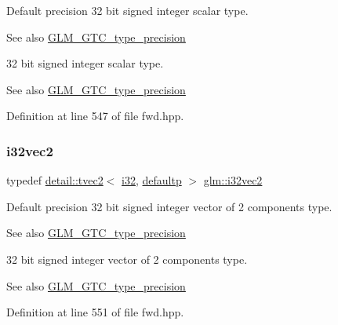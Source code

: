 Default precision 32 bit signed integer scalar type. \begin{DoxySeeAlso}{See also}
\hyperlink{group__gtc__type__precision}{G\+L\+M\+\_\+\+G\+T\+C\+\_\+type\+\_\+precision}
\end{DoxySeeAlso}
32 bit signed integer scalar type. \begin{DoxySeeAlso}{See also}
\hyperlink{group__gtc__type__precision}{G\+L\+M\+\_\+\+G\+T\+C\+\_\+type\+\_\+precision} 
\end{DoxySeeAlso}


Definition at line 547 of file fwd.\+hpp.

\mbox{\label{group__gtc__type__precision_gabb9ac4a278f8a8e3a3928dc9bef81089}} 
\subsubsection{\texorpdfstring{i32vec2}{i32vec2}}
{\footnotesize\ttfamily typedef \hyperlink{structglm_1_1detail_1_1tvec2}{detail\+::tvec2}$<$ \hyperlink{group__gtc__type__precision_ga1d8ed5c43e91ea7d4528389da4fa9524}{i32}, \hyperlink{namespaceglm_a0f04f086094c747d227af4425893f545a9d21ccd8b5a009ec7eb7677befc3bf51}{defaultp} $>$ \hyperlink{group__gtc__type__precision_gabb9ac4a278f8a8e3a3928dc9bef81089}{glm\+::i32vec2}}

Default precision 32 bit signed integer vector of 2 components type. \begin{DoxySeeAlso}{See also}
\hyperlink{group__gtc__type__precision}{G\+L\+M\+\_\+\+G\+T\+C\+\_\+type\+\_\+precision}
\end{DoxySeeAlso}
32 bit signed integer vector of 2 components type. \begin{DoxySeeAlso}{See also}
\hyperlink{group__gtc__type__precision}{G\+L\+M\+\_\+\+G\+T\+C\+\_\+type\+\_\+precision} 
\end{DoxySeeAlso}


Definition at line 551 of file fwd.\+hpp.

\mbox{\label{group__gtc__type__precision_ga79a21b299190b6fee673087376753db0}} 

